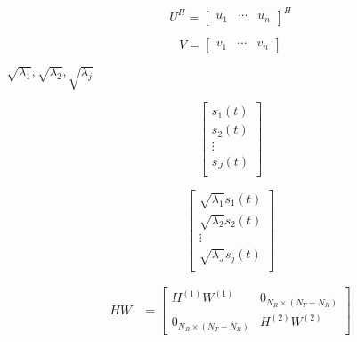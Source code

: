 \documentclass{ltjsarticle}
\begin{document}
\begin{equation*}
  U^H =
  \begin{bmatrix}
    u_1 & \cdots & u_n
  \end{bmatrix}^H
\end{equation*}

\begin{equation*}
  V =
  \begin{bmatrix}
    v_1 & \cdots & v_n
  \end{bmatrix}
\end{equation*}

$\sqrt{\lambda_1},\sqrt{\lambda_2},\sqrt{\lambda_j}$

\begin{equation*}
  \begin{bmatrix}
    s_1(t)\\
    s_2(t)\\
    \vdots\\
    s_J(t)\\
  \end{bmatrix}
\end{equation*}

\begin{equation*}
  \begin{bmatrix}
    \sqrt{\lambda_1}s_1(t)\\
    \sqrt{\lambda_2}s_2(t)\\
    \vdots\\
    \sqrt{\lambda_J}s_j(t)\\
  \end{bmatrix}
\end{equation*}

\begin{align*}
  HW &=
    \begin{bmatrix}
      H^{(1)}W^{(1)} & 0_{N_R \times (N_T - N_R)}\\
      0_{N_R \times (N_T - N_R)} & H^{(2)}W^{(2)}
    \end{bmatrix}
\end{align*}
\end{document}
